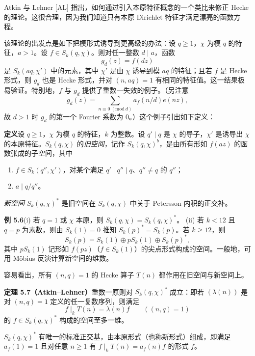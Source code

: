 Atkin 与 Lehner [AL] 指出，如何通过引入本原特征概念的一个类比来修正 Hecke 的理论。这很合理，因为我们知道只有本原 Dirichlet 特征才满足漂亮的函数方程。

该理论的出发点是如下把模形式诱导到更高级的办法：设 $q\ge1$，$\chi$ 为模 $q$ 的特征，$a>1$。设 $f\in S_{k}(q,\chi)$。则对任一整数 $d\mid a$，函数
\[
g_{d}(z)=f(dz)
\]
是 $S_{k}(aq,\chi')$ 中的元素，其中 $\chi'$ 是由 $\chi$ 诱导到模 $aq$ 的特征；且若 $f$ 是 Hecke 形式，则 $g_{d}$ 也是 Hecke 形式，并对 $(n,aq)=1$ 有相同的特征值。这一结果极易验证。特别地，$f$ 与 $g_{d}$ 提供了重数一失效的例子。（另注意
\[
g_{d}(z)=\sum_{n\equiv0\ (\mathrm{mod}\ d)}a_{f}(n/d)e(nz),
\]
故 $d>1$ 时 $g_{d}$ 的第一个 Fourier 系数为 $0$。）这个例子引出如下定义：

\par\medskip\noindent\textbf{定义}\quad 设 $q\ge1$，$\chi$ 为模 $q$ 的特征，$k$ 为整数。设 $q'\mid q$ 是 $\chi$ 的导子，$\chi'$ 是诱导出 $\chi$ 的本原特征。$S_{k}(q,\chi)$ 的\emph{旧空间}，记作 $S_{k}(q,\chi)^{b}$，是由所有形如 $f(az)$ 的函数张成的子空间，其中
\begin{enumerate}[label=(\roman*),leftmargin=2.6em]
\item $f\in S_{k}(q'',\chi')$，对某个满足 $q'\mid q''\mid q$、$q''\ne q$ 的 $q''$；
\item $a\mid q/q''$。
\end{enumerate}

\emph{新空间} $S_{k}(q,\chi)^{*}$ 是旧空间在 $S_{k}(q,\chi)$ 中关于 Petersson 内积的正交补。

\par\medskip\noindent\textbf{例 5.6}\quad (i) 若 $q=1$ 或 $\chi$ 本原，则 $S_{k}(q,\chi)=S_{k}(q,\chi)^{*}$。
(ii) 若 $k<12$ 且 $q=p$ 为素数，则由 $S_{k}(1)=0$ 推知 $S_{k}(p)^{*}=S_{k}(p)$。若 $k\ge12$，则
\[
S_{k}(p)=S_{k}(1)\oplus pS_{k}(1)\oplus S_{k}(p)^{*},
\]
其中 $pS_{k}(1)$ 记形如 $f(pz)$（$f\in S_{k}(1)$）的尖点形式构成的空间。一般地，可用 Möbius 反演计算新空间的维数。

容易看出，所有 $(n,q)=1$ 的 Hecke 算子 $T(n)$ 都作用在旧空间与新空间上。

\par\medskip\noindent\textbf{定理 5.7（Atkin--Lehner）}\quad 重数一原则对 $S_{k}(q,\chi)^{*}$ 成立：即若 $(\lambda(n))$ 是对 $(n,q)=1$ 定义的任一复数序列，则满足
\[
f\mid_{k}T(n)=\lambda(n)f\qquad((n,q)=1)
\]
的 $f\in S_{k}(q,\chi)^{*}$ 构成的空间至多一维。

$S_{k}(q,\chi)^{*}$ 有唯一的标准正交基，由本原形式（也称新形式）组成，即满足 $a_{f}(1)=1$ 且对任意 $n\ge1$ 有 $f\mid_{k}T(n)=a_{f}(n)f$ 的形式 $f$。


